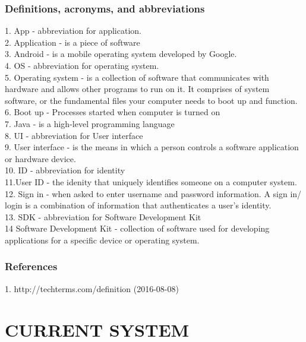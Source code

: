\documentclass[12pt]{article}
\begin{document}
\subsubsection{Definitions, acronyms, and abbreviations}
1. App - abbreviation for application. \\
2. Application - is a piece of software \\
3. Android - is a mobile operating system developed by Google. \\
4. OS - abbreviation for operating system.\\
5. Operating system - is a collection of software that communicates with hardware and allows other programs to run on it. It comprises  of system software, or the fundamental files your computer needs to boot up and function.\\
6. Boot up - Processes started when computer is turned on\\
7. Java - is a high-level programming language\\
8. UI - abbreviation for User interface\\
9. User interface - is the means in which a person controls a software application or hardware device.\\
10. ID - abbreviation for identity\\
11.User ID - the idenity that uniquely identifies someone on a computer system.\\
12. Sign in - when asked to enter username and password information. A sign in/ login is a combination of information that authenticates a user's identity. \\
13. SDK - abbreviation for Software Development Kit\\
14 Software Development Kit -  collection of software used for developing applications for a specific device or operating system.\\
 

\subsubsection{References}
1. http://techterms.com/definition (2016-08-08)

\section{CURRENT SYSTEM}
\end{document}

